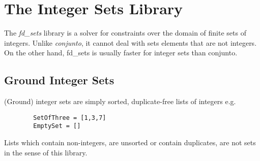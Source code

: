 %
% 
% 
% 
% 

\chapter{The Integer Sets Library}
\label{chapfdsets}



The {\em fd_sets} library is a solver for constraints over the domain
of finite sets of integers. Unlike {\em conjunto}, it cannot deal with
sets elements that are not integers. On the other hand, fd_sets is usually
faster for integer sets than conjunto.



\section{Ground Integer Sets}

(Ground) integer sets are simply sorted, duplicate-free lists of integers e.g. 
\begin{verbatim}
        SetOfThree = [1,3,7]
        EmptySet = []
\end{verbatim}
Lists which contain non-integers, are unsorted or contain duplicates,
are not sets in the sense of this library.


